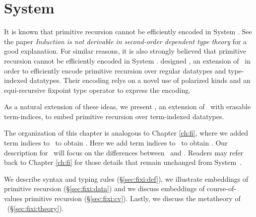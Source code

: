 \chapter{System \Fixi}\label{ch:fixi}

It is known that primitive recursion cannot be efficiently encoded in System \F.
See the paper 
{\it Induction is not derivable in second-order dependent type theory}
\cite{Geuvers01} for a good explanation. For similar reasons, it is also strongly believed that
primitive recursion cannot be efficiently encoded in System \Fw. 
\citet{AbeMat04} designed \Fixw, an extension of \Fw\ in order to efficiently
encode primitive recursion
over regular datatypes and type-indexed datatypes. Their
encoding relys on a novel use of
polarized kinds and
an equi-recursive fixpoint type operator to  express the encoding.

As a natural extension of these ideas, we present \Fixi, an extension of \Fixw\ with erasable term-indices,
to embed primitive recursion over term-indexed datatypes.

The organization of this chapter is analogous to Chapter \ref{ch:fi}, 
where we added term indices to \Fw\ to obtain \Fi. Here
we add term indices to \Fixw\ to obtain \Fixi. Our
description for \Fixi\ will focus on the differences between \Fi\ and \Fixi.
Readers may refer back to Chapter \ref{ch:fi} for those details that remain
unchanged from System~\Fi.

We describe syntax and typing rules (\S\ref{sec:fixi:def}),
we illustrate embeddings of primitive recursion (\S\ref{sec:fixi:data})
and we discuss embeddings of course-of-values primitive recursion
(\S\ref{sec:fixi:cv}). Lastly, we
discuss the metatheory of \Fixi\ (\S\ref{sec:fixi:theory}).





